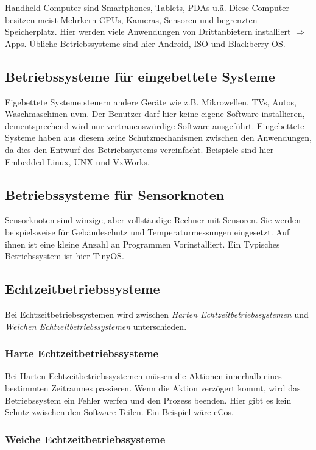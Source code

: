Handheld Computer sind Smartphones, Tablets, PDAs u.ä. Diese Computer besitzen meist Mehrkern-CPUs, Kameras, Sensoren und begrenzten Speicherplatz. Hier werden viele Anwendungen von Drittanbietern installiert $\Rightarrow$ Apps. Übliche Betriebssysteme sind hier Android, ISO und Blackberry OS.

\subsection{Betriebssysteme für eingebettete Systeme}

Eigebettete Systeme steuern andere Geräte wie z.B. Mikrowellen, TVs, Autos, Waschmaschinen uvm. Der Benutzer darf hier keine eigene Software installieren, dementsprechend wird nur vertrauenswürdige Software ausgeführt. Eingebettete Systeme haben aus diesem keine Schutzmechanismen zwischen den Anwendungen, da dies den Entwurf des Betriebssystems vereinfacht. Beispiele sind hier Embedded Linux, UNX und VxWorks.

\subsection{Betriebssysteme für Sensorknoten}

Sensorknoten sind winzige, aber vollständige Rechner mit Sensoren. Sie werden beispielsweise für Gebäudeschutz und Temperaturmessungen eingesetzt. Auf ihnen ist eine kleine Anzahl an Programmen Vorinstalliert. Ein Typisches Betriebssystem ist hier TinyOS.

\subsection{Echtzeitbetriebssysteme}

Bei Echtzeitbetriebssystemen wird zwischen \textit{Harten Echtzeitbetriebssystemen} und \textit{Weichen Echtzeitbetriebssystemen} unterschieden.

\subsubsection*{Harte Echtzeitbetriebssysteme}

Bei Harten Echtzeitbetriebssystemen müssen die Aktionen innerhalb eines bestimmten Zeitraumes passieren. Wenn die Aktion verzögert kommt, wird das Betriebssystem ein Fehler werfen und den Prozess beenden. Hier gibt es kein Schutz zwischen den Software Teilen. Ein Beispiel wäre eCos.

\subsubsection*{Weiche Echtzeitbetriebssysteme}

